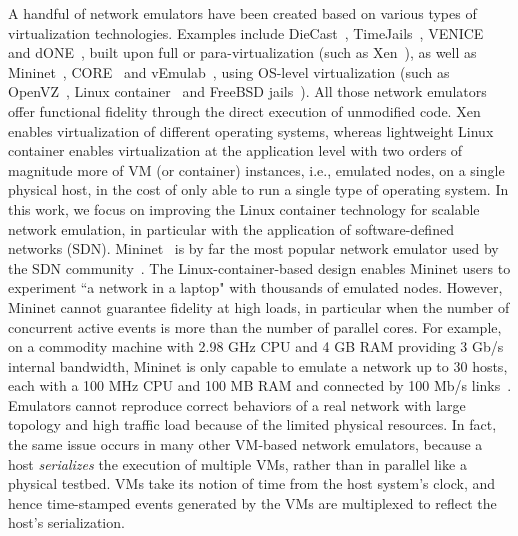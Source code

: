 A handful of network emulators have been created based on various types of virtualization technologies. 
Examples include DieCast~\cite{DieCast}, TimeJails~\cite{TimeJails}, VENICE~\cite{VirtualTimeMachine} and dONE~\cite{RelativisticTime},
built upon full or para-virtualization (such as Xen~\cite{Xen}), as well as Mininet~\cite{LaptopSDN, ReproNetExprCBE}, CORE~\cite{CORE} and vEmulab~\cite{Emulab},
using OS-level virtualization (such as OpenVZ~\cite{OpenVZ}, Linux container~\cite{LXC} and FreeBSD jails~\cite{FreeBSDJails}).
All those network emulators offer functional fidelity through the direct execution of unmodified code. 
Xen enables virtualization of different operating systems, whereas lightweight Linux container enables virtualization at the application level with two orders of magnitude more of VM (or container) instances, i.e., emulated nodes, on a single physical host, in the cost of only able to run a single type of operating system. 
In this work, we focus on improving the Linux container technology for scalable network emulation, in particular with the application of software-defined networks (SDN). 
Mininet~\cite{LaptopSDN} is by far the most popular network emulator used by the SDN community~\cite{Frenetic, AbsNetUpd, LivMigEntNet}. 
The Linux-container-based design enables Mininet users to experiment ``a network in a laptop" with thousands of emulated nodes. 
However, Mininet cannot guarantee fidelity at high loads, in particular when the number of concurrent active events is more than the number of parallel cores. 
For example, on a commodity machine with 2.98 GHz CPU and 4 GB RAM providing 3 Gb/s internal bandwidth,
Mininet is only capable to emulate a network up to 30 hosts, each with a 100 MHz CPU and 100 MB RAM and connected by 100 Mb/s links~\cite{ReproNetExprCBE}. 
Emulators cannot reproduce correct behaviors of a real network with large topology and high traffic load because of the limited physical resources. 
In fact, the same issue occurs in many other VM-based network emulators, because a host \emph{serializes} the execution of multiple VMs, rather than in parallel like a physical testbed. 
VMs take its notion of time from the host system's clock, and hence time-stamped events generated by the VMs are multiplexed to reflect the host's serialization.

